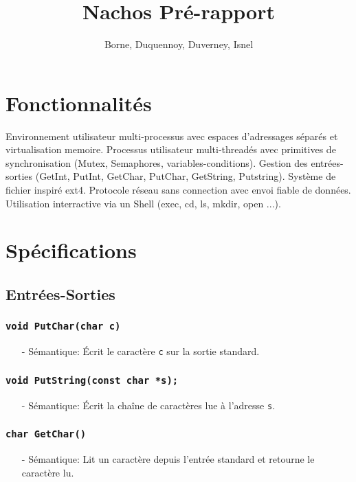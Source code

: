 \documentclass[11pt]{article}
\author{Borne, Duquennoy, Duverney, Isnel}
\date{}
\title{Nachos Pré-rapport}
\begin{document}
\maketitle



\section{Fonctionnalités}
Environnement utilisateur multi-processus avec espaces d'adressages séparés et virtualisation memoire.
Processus utilisateur multi-threadés avec primitives de synchronisation (Mutex, Semaphores, variables-conditions).
Gestion des entrées-sorties (GetInt, PutInt, GetChar, PutChar, GetString, Putstring).
Système de fichier inspiré ext4.
Protocole réseau sans connection avec envoi fiable de données.
Utilisation interractive via un Shell (exec, cd, ls, mkdir, open ...).
\section{Spécifications}
\subsection{Entrées-Sorties}

\subsubsection{\texttt{void PutChar(char c)}}
\begin{itemize}
\item[-] Sémantique: Écrit le caractère \texttt{c} sur la sortie standard.
\end{itemize}

\subsubsection{\texttt{void PutString(const char *s);}}
\begin{itemize}
\item[-] Sémantique: Écrit la chaîne de caractères lue à l'adresse \texttt{s}.
\end{itemize}

\subsubsection{\texttt{char GetChar()}}
\begin{itemize}
\item[-] Sémantique: Lit un caractère depuis l'entrée standard et retourne le caractère lu.
\end{itemize}
\end{document}
